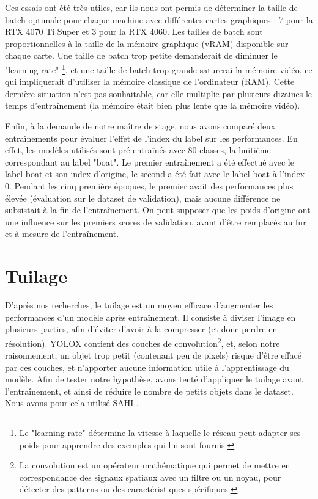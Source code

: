 Ces essais ont été très utiles, car ils nous ont permis de déterminer la taille de batch
optimale \cite{Goodfellow-et-al-2016} pour chaque machine avec différentes cartes graphiques :
7 pour la RTX 4070 Ti Super et 3 pour la RTX 4060.
Les tailles de batch sont proportionnelles à la taille de la mémoire graphique (vRAM)
disponible sur chaque carte. Une taille de batch trop petite demanderait de diminuer le "learning rate"
\footnote{Le "learning rate" détermine la vitesse à laquelle le réseau peut adapter ses poids
pour apprendre des exemples qui lui sont fournis.}, et une taille de batch trop grande
saturerai la mémoire vidéo, ce qui impliquerait d'utiliser la mémoire classique de l'ordinateur (RAM).
Cette dernière situation n'est pas souhaitable, car elle multiplie par plusieurs dizaines
le temps d'entraînement (la mémoire était bien plus lente que la mémoire vidéo).

Enfin, à la demande de notre maître de stage, nous avons comparé deux entraînements pour évaluer
l'effet de l'index du label sur les performances.
En effet, les modèles utilisés sont pré-entraînés avec 80 classes, la huitième correspondant
au label "boat". Le premier entraînement a été effectué avec le label boat et son index d'origine,
le second a été fait avec le label boat à l'index 0.
Pendant les cinq première époques, le premier avait des performances plus élevée (évaluation sur
le dataset de validation), mais aucune différence ne subsistait à la fin de l'entraînement.
On peut supposer que les poids d'origine ont une influence sur les premiers scores de validation, avant d'être remplacés au fur et à mesure de l'entraînement.


\section{Tuilage}

D'après nos recherches, le tuilage est un moyen efficace d'augmenter les performances d'un modèle après
entraînement. Il consiste à diviser l'image en plusieurs parties, afin d'éviter d'avoir à la compresser
(et donc perdre en résolution).
YOLOX contient des couches de convolution\footnote{La convolution est un opérateur mathématique
qui permet de mettre en correspondance des signaux spatiaux avec un filtre ou un noyau,
pour détecter des patterns ou des caractéristiques spécifiques.}, et, selon notre raisonnement,
un objet trop petit (contenant peu de pixels) risque d'être effacé par ces couches, et n'apporter
aucune information utile à l'apprentissage du modèle.
Afin de tester notre hypothèse, avons tenté d'appliquer le tuilage avant l'entraînement,
et ainsi de réduire le nombre de petits objets dans le dataset.
Nous avons pour cela utilisé SAHI \cite{Akyon_Altinuc_Temizel_2022}.

